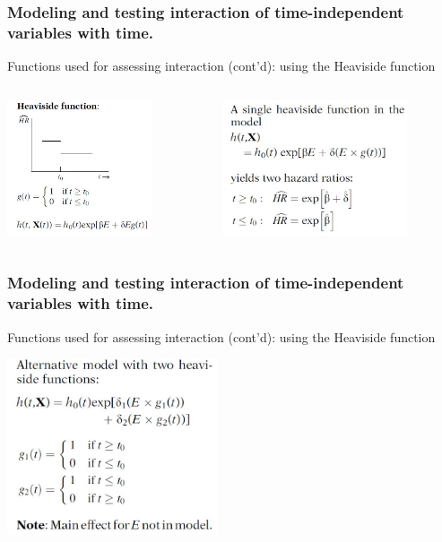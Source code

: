\documentclass{beamer}
\theoremstyle{definition}
\begin{document}
\begin{frame}
\frametitle{Modeling and testing interaction of time-independent variables with time.} 
\begin{block}{Functions used for assessing interaction (cont'd): using the Heaviside function}
\begin{columns}
    \begin{column}{0.48\textwidth}
        \includegraphics[width =\textwidth, height=4cm]{CH6_HeSi.JPG}
    \end{column}
    \hspace{-10pt}
    \begin{column}{0.48\textwidth}
         \includegraphics[width =\textwidth, height=4cm]{CH6_HeSi2.JPG}
    \end{column}
\end{columns}
\end{block}
\end{frame}

\begin{frame}
\frametitle{Modeling and testing interaction of time-independent variables with time.} 
\begin{block}{Functions used for assessing interaction (cont'd): using the Heaviside function}
\vspace{-20pt}
\begin{center}
\includegraphics[width =\textwidth, height=5.2cm]{CH6_HeSi3.JPG}
\end{center}
\end{block}
\end{frame}
\end{document}
